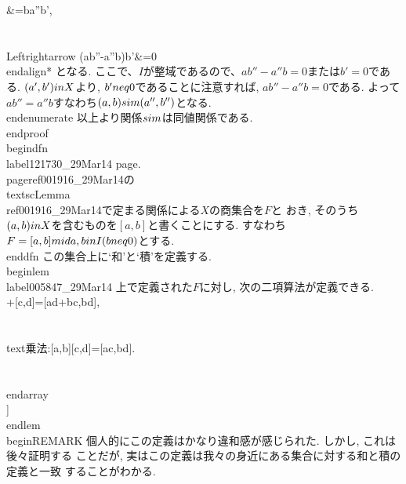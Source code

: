           &=ba''b', \\\\
          \\Leftrightarrow (ab''-a''b)b'&=0 
        \\end{align*}
        となる. 
        ここで、$I$が整域であるので、$ab''-a''b=0$または$b'=0$である.
        $(a',b')\\in X$より, $b'\\neq 0$であることに注意すれば,
        $ab''-a''b=0$である. よって$ab''=a''b$すなわち$(a,b)\\sim
        (a'',b'')$となる. 
 \\end{enumerate}
 以上より関係$\\sim$は同値関係である.
\\end{proof}
\\begin{dfn}
 \\label{121730_29Mar14}
 page.\\pageref{001916_29Mar14}の\\textsc{Lemma}~\\ref{001916_29Mar14}で定まる関係による$X$の商集合を$F$と
 おき, そのうち$(a,b)\\in X$を含むものを$[a,b]$と書くことにする. すなわち
 $F=\\{[a,b]\\mid a,b\\in I(b\\neq 0)\\}$とする.
\\end{dfn}
この集合上に`和'と`積'を定義する.
\\begin{lem}
 \\label{005847_29Mar14}
 上で定義された$F$に対し, 次の二項算法が定義できる.
 \\[
  \\begin{array}{l}
   \\text{加法}:[a,b]+[c,d]=[ad+bc,bd],\\\\
   \\text{乗法}:[a,b][c,d]=[ac,bd].\\\\
  \\end{array}
 \\]
\\end{lem}
\\begin{REMARK}
 個人的にこの定義はかなり違和感が感じられた. しかし, これは後々証明する
 ことだが, 実はこの定義は我々の身近にある集合に対する和と積の定義と一致
 することがわかる.\\\\
